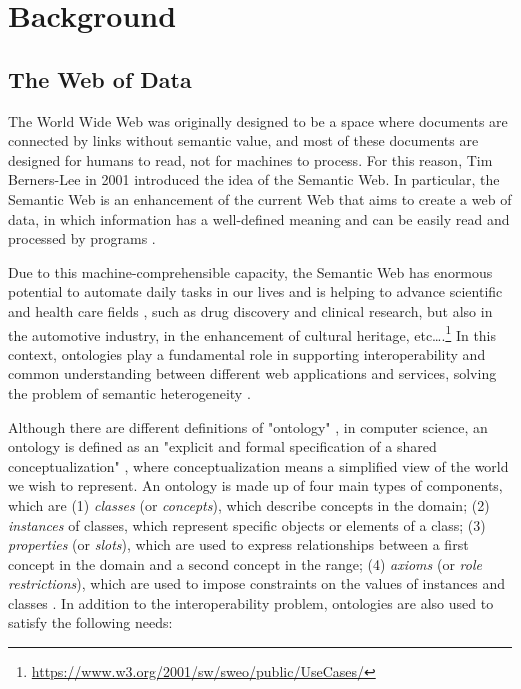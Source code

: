 
\chapter{Background}
\label{chp:background}

\section{The Web of Data}
\label{sec:web-of-data}

The World Wide Web was originally designed to be a space where documents are connected by links without semantic value, and most of these documents are designed for humans to read, not for machines to process. For this reason, Tim Berners-Lee in 2001 introduced the idea of the Semantic Web. In particular, the Semantic Web is an enhancement of the current Web that aims to create a web of data, in which information has a well-defined meaning and can be easily read and processed by programs \cite{berners2001semantic}.

Due to this machine-comprehensible capacity, the Semantic Web has enormous potential to automate daily tasks in our lives and is helping to advance scientific and health care fields \cite{feigenbaum2007semantic}, such as drug discovery and clinical research, but also in the automotive industry, in the enhancement of cultural heritage, etc\dots.\footnote{\url{https://www.w3.org/2001/sw/sweo/public/UseCases/}} In this context, ontologies play a fundamental role in supporting interoperability and common understanding between different web applications and services, solving the problem of semantic heterogeneity \cite{taye2010understanding}.

Although there are different definitions of "ontology" \cite{taye2010understanding}, in computer science, an ontology is defined as an "explicit and formal specification of a shared conceptualization" \cite{gruber1995toward}, where conceptualization means a simplified view of the world we wish to represent. An ontology is made up of four main types of components, which are (1) \textit{classes} (or \textit{concepts}), which describe concepts in the domain; (2) \textit{instances} of classes, which represent specific objects or elements of a class; (3) \textit{properties} (or \textit{slots}), which are used to express relationships between a first concept in the domain and a second concept in the range; (4) \textit{axioms} (or \textit{role restrictions}), which are used to impose constraints on the values of instances and classes \cite{taye2010understanding, noy2001ontology}. In addition to the interoperability problem, ontologies are also used to satisfy the following needs:

